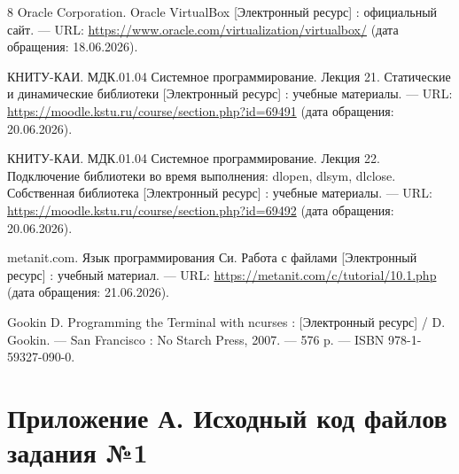 \documentclass[14pt]{extreport}
\begin{document}
{\begin{thebibliography}{8}
Oracle Corporation. Oracle VirtualBox [Электронный ресурс] : официальный сайт. — URL: 
\href{https://www.oracle.com/virtualization/virtualbox/}{https://www.oracle.com/virtualization/virtualbox/} 
(дата обращения: 18.06.2026).

КНИТУ-КАИ. МДК.01.04 Системное программирование. Лекция 21. Статические и динамические библиотеки [Электронный ресурс] : учебные материалы. — URL: 
\href{https://moodle.kstu.ru/course/section.php?id=69491}{https://moodle.kstu.ru/course/section.php?id=69491} 
(дата обращения: 20.06.2026).

КНИТУ-КАИ. МДК.01.04 Системное программирование. Лекция 22. Подключение библиотеки во время выполнения: dlopen, dlsym, dlclose. Собственная библиотека [Электронный ресурс] : учебные материалы. — URL: 
\href{https://moodle.kstu.ru/course/section.php?id=69492}{https://moodle.kstu.ru/course/section.php?id=69492} 
(дата обращения: 20.06.2026).

metanit.com. Язык программирования Си. Работа с файлами [Электронный ресурс] : учебный материал. — URL: 
\href{https://metanit.com/c/tutorial/10.1.php}{https://metanit.com/c/tutorial/10.1.php} 
(дата обращения: 21.06.2026).

Gookin D. Programming the Terminal with ncurses : [Электронный ресурс] / D. Gookin. — San Francisco : No Starch Press, 2007. — 576 p. — ISBN 978-1-59327-090-0.

\end{thebibliography}

\newpage
\captionsetup[listing]{labelformat=empty}
{\flushleft\section*{Приложение А. Исходный код файлов задания №1}}








}
\end{document}
